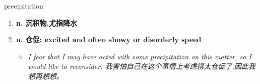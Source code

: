 
\begin{frame}
{\huge precipitation}
\begin{center}
\begin{enumerate}\Large
  \item \textbf{n. 沉积物,尤指降水}
  \item \textbf{n. 仓促: excited and often showy or disorderly speed}
  \begin{itemize}
    \item \em{\Large{I fear that I may have acted with some precipitation on this matter, so I would like to reconsider. 我害怕自己在这个事情上考虑得太仓促了,因此我想再想想。}}
  \end{itemize}
\end{enumerate}
\end{center}
\end{frame}
